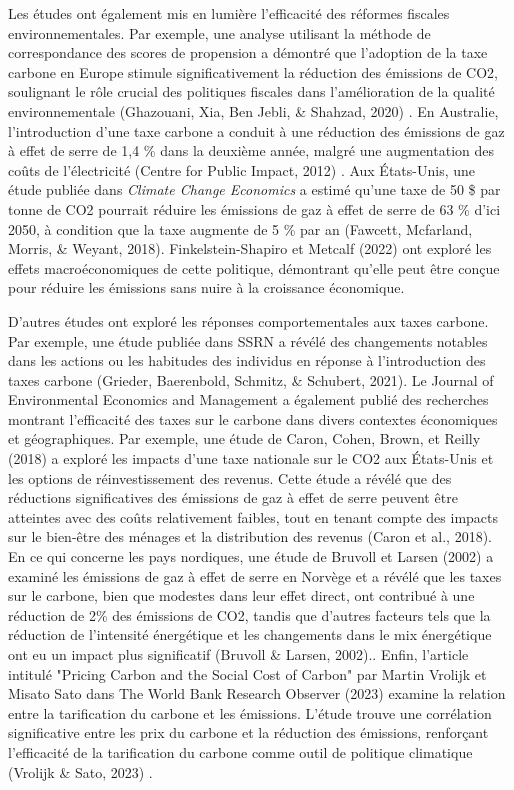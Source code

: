 Les études ont également mis en lumière l'efficacité des réformes fiscales environnementales. Par exemple, une analyse utilisant la méthode de correspondance des scores de propension a démontré que l'adoption de la taxe carbone en Europe stimule significativement la réduction des émissions de CO2, soulignant le rôle crucial des politiques fiscales dans l'amélioration de la qualité environnementale (Ghazouani, Xia, Ben Jebli, \& Shahzad, 2020) \supercite{Ghazouani2020}. En Australie, l'introduction d'une taxe carbone a conduit à une réduction des émissions de gaz à effet de serre de 1,4 \% dans la deuxième année, malgré une augmentation des coûts de l'électricité (Centre for Public Impact, 2012) \supercite{CentrePublicImpact2012}. Aux États-Unis, une étude publiée dans \textit{Climate Change Economics} a estimé qu'une taxe de 50 \$ par tonne de CO2 pourrait réduire les émissions de gaz à effet de serre de 63 \% d'ici 2050, à condition que la taxe augmente de 5 \% par an (Fawcett, Mcfarland, Morris, & Weyant, 2018)\supercite{Fawcett2018}. Finkelstein-Shapiro et Metcalf (2022) \supercite{Finkelstein} ont exploré les effets macroéconomiques de cette politique, démontrant qu'elle peut être conçue pour réduire les émissions sans nuire à la croissance économique.

D'autres études ont exploré les réponses comportementales aux taxes carbone. Par exemple, une étude publiée dans SSRN a révélé des changements notables dans les actions ou les habitudes des individus en réponse à l'introduction des taxes carbone (Grieder, Baerenbold, Schmitz, \& Schubert, 2021)\supercite{grieder2021}. Le Journal of Environmental Economics and Management a également publié des recherches montrant l'efficacité des taxes sur le carbone dans divers contextes économiques et géographiques. Par exemple, une étude de Caron, Cohen, Brown, et Reilly (2018) a exploré les impacts d'une taxe nationale sur le CO2 aux États-Unis et les options de réinvestissement des revenus. Cette étude a révélé que des réductions significatives des émissions de gaz à effet de serre peuvent être atteintes avec des coûts relativement faibles, tout en tenant compte des impacts sur le bien-être des ménages et la distribution des revenus (Caron et al., 2018).\supercite{caron} En ce qui concerne les pays nordiques,  une étude de Bruvoll et Larsen (2002) a examiné les émissions de gaz à effet de serre en Norvège et a révélé que les taxes sur le carbone, bien que modestes dans leur effet direct, ont contribué à une réduction de 2\% des émissions de CO2, tandis que d'autres facteurs tels que la réduction de l'intensité énergétique et les changements dans le mix énergétique ont eu un impact plus significatif (Bruvoll \& Larsen, 2002).\supercite{bruvoll}.  Enfin, l'article intitulé "Pricing Carbon and the Social Cost of Carbon" par Martin Vrolijk et Misato Sato dans The World Bank Research Observer (2023) examine la relation entre la tarification du carbone et les émissions. L'étude trouve une corrélation significative entre les prix du carbone et la réduction des émissions, renforçant l'efficacité de la tarification du carbone comme outil de politique climatique (Vrolijk \& Sato, 2023) \supercite{vrolijk2023}.

